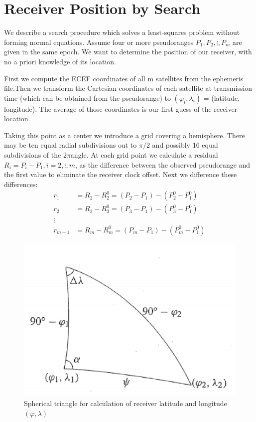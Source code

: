 \section{Receiver Position by Search}
	We describe a search procedure which solves a least-squares problem without forming normal equations. Assume four or more pseudoranges $P_1,P_2,\vdots,P_m$ are given in the same epoch. We want to determine the position of our receiver, with no a priori knowledge of its location.
	
	First we compute the ECEF coordinates of all m satellites from the ephemeris file.Then wc transform the Cartesian coordinates of each satellite at transmission time (which can be obtained from the pseudorange) to $(\varphi_i,\lambda_i)$ = (latitude, longitude). The average of those coordinates is our first guess of the receiver location.
	
	Taking this point as a center we introduce a grid covering a hemisphere. There may be ten equal radial subdivisions out to $\pi/2$ and possibly 16 equal subdivisions of the $2\pi$angle. At each grid point we calculate a residual $R_i=P_i-P_1,i=2,\vdots,m $, as the difference between the observed pseudorange and the first value to eliminate the receiver clock offset. Next we difference these differences:
	\begin{align*}
	 r_1& = R_2-R^0_2 = (P_2-P_1) - (P^0_2-P^0_1) \\
	 r_2& = R_3-R^0_3 = (P_3-P_1) - (P^0_3-P^0_1) \\
	\vdots& \\
	 r_{m-1}& = R_m-R^0_m = (P_m-P_1) - (P^0_m-P^0_1) 
	\end{align*}
	\begin{figure}
		\centering
		\includegraphics[width=0.7\linewidth]{TeX_files/Part03/chapter09/image/9-15}
		\caption{Spherical triangle for calculation of receiver latitude and longitude $(\varphi,\lambda)$}
		\label{fig:9-15}
	\end{figure}


